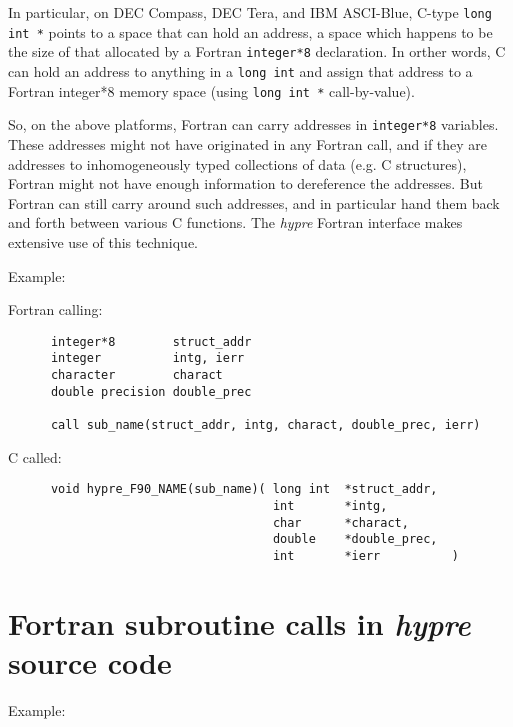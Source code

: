 \vspace{0.2in}


In particular, on DEC Compass, DEC Tera, and IBM ASCI-Blue, C-type
\verb+long int *+ points to a space that can hold an address, a space
which happens to be the size of that allocated by a Fortran
\verb+integer*8+ declaration.
In orther words, C can hold an address to anything in a \verb+long int+ and
assign that address to a Fortran integer*8 memory space (using \verb+long int *+ call-by-value).

So, on the above platforms, Fortran can carry addresses in \verb+integer*8+
variables.  These addresses might not have originated in any Fortran call,
and if they are addresses to inhomogeneously typed collections of data
(e.g. C structures), Fortran might not have enough information to dereference
the addresses.  But Fortran can still carry around such addresses, and in
particular hand them back and forth between various C functions.  The
{\slshape hypre} Fortran interface makes extensive use of this technique.

\vspace{0.1in}

\noindent Example:

\vspace{0.1in}

  Fortran calling:
\begin{verbatim}
      integer*8        struct_addr
      integer          intg, ierr
      character        charact
      double precision double_prec

      call sub_name(struct_addr, intg, charact, double_prec, ierr)
\end{verbatim}
  C called:
\begin{verbatim}
      void hypre_F90_NAME(sub_name)( long int  *struct_addr,
                                     int       *intg,
                                     char      *charact,
                                     double    *double_prec,
                                     int       *ierr          )
\end{verbatim}

\section{Fortran subroutine calls in {\slshape hypre} source code}

\vspace{0.1in}

\noindent Example:

